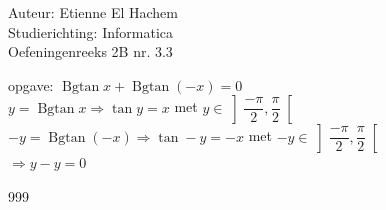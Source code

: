 \documentclass[a4paper]{article}
\DeclareMathOperator{\bgtan}{Bgtan}
\begin{document}
  
\noindent \large Auteur: Etienne El Hachem \\
\noindent \large Studierichting: Informatica\\
\noindent \large Oefeningenreeks 2B nr. 3.3\\

\medskip

\normalsize

opgave: $\bgtan x + \bgtan \left(-x\right) = 0$\\

$y = \bgtan x \Rightarrow \tan y = x$ met $y \in \left]\dfrac{-\pi}{2},\dfrac{\pi}{2}\right[$\\

$-y = \bgtan \left(-x\right) \Rightarrow \tan -y = -x$ met $-y \in \left]\dfrac{-\pi}{2},\dfrac{\pi}{2}\right[$\\

$\Rightarrow y - y = 0$

\begin{thebibliography}{999}
\end{thebibliography}
\end{document}
